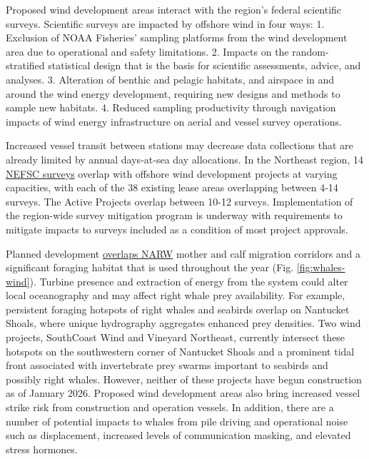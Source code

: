 \documentclass[
  10pt,
]{article}
\begin{document}
Proposed wind development areas interact with the region's federal scientific surveys. Scientific surveys are impacted by offshore wind in four ways:
1. Exclusion of NOAA Fisheries' sampling platforms from the wind development area due to operational and safety limitations.
2. Impacts on the random-stratified statistical design that is the basis for scientific assessments, advice, and analyses.
3. Alteration of benthic and pelagic habitats, and airspace in and around the wind energy development, requiring new designs and methods to sample new habitats.
4. Reduced sampling productivity through navigation impacts of wind energy infrastructure on aerial and vessel survey operations.

Increased vessel transit between stations may decrease data collections that are already limited by annual days-at-sea day allocations. In the Northeast region, 14 \href{https://noaa-edab.github.io/catalog/osw_survey_impact.html}{NEFSC surveys} overlap with offshore wind development projects at varying capacities, with each of the 38 existing lease areas overlapping between 4-14 surveys. The Active Projects overlap between 10-12 surveys. Implementation of the region-wide survey mitigation program is underway with requirements to mitigate impacts to surveys included as a condition of most project approvals.

Planned development \href{https://noaa-edab.github.io/catalog/persistent_hotspots.html}{overlaps NARW} mother and calf migration corridors and a significant foraging habitat that is used throughout the year (Fig. \ref{fig:whales-wind}). Turbine presence and extraction of energy from the system could alter local oceanography and may affect right whale prey availability. For example, persistent foraging hotspots of right whales and seabirds overlap on Nantucket Shoals, where unique hydrography aggregates enhanced prey densities. Two wind projects, SouthCoast Wind and Vineyard Northeast, currently intersect these hotspots on the southwestern corner of Nantucket Shoals and a prominent tidal front associated with invertebrate prey swarms important to seabirds and possibly right whales. However, neither of these projects have begun construction as of January 2026. Proposed wind development areas also bring increased vessel strike risk from construction and operation vessels. In addition, there are a number of potential impacts to whales from pile driving and operational noise such as displacement, increased levels of communication masking, and elevated stress hormones.
\end{document}
